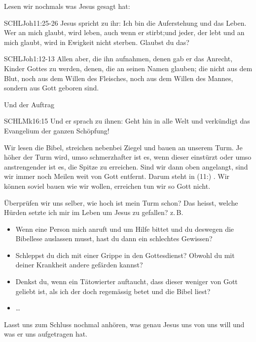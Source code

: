 \documentclass[fontsize=16pt]{mybib}
\begin{document}
\begin{otsblock}
    Lesen wir nochmals was Jesus gesagt hat:
    \begin{bibelbox}{SCHL}{Joh}{11:25-26}
        Jesus spricht zu ihr: Ich bin die Auferstehung und das Leben. Wer an mich glaubt, wird leben, auch wenn er stirbt;und jeder, der lebt und an mich glaubt, wird in Ewigkeit nicht sterben. Glaubst du das?
    \end{bibelbox} 
    \begin{bibelbox}{SCHL}{Joh}{1:12-13}
        Allen aber, die ihn aufnahmen, denen gab er das Anrecht, Kinder Gottes zu werden, denen, die an seinen Namen glauben;
        die nicht aus dem Blut, noch aus dem Willen des Fleisches, noch aus dem Willen des Mannes, sondern aus Gott geboren sind.
    \end{bibelbox}     
    Und der Auftrag
    \begin{bibelbox}{SCHL}{Mk}{16:15}
        Und er sprach zu ihnen: Geht hin in alle Welt und verkündigt das Evangelium der ganzen Schöpfung!
    \end{bibelbox} 
    Wir lesen die Bibel, streichen nebenbei Ziegel und bauen an unserem Turm. Je höher der Turm wird, umso schmerzhafter ist es, wenn dieser einstürzt oder umso anstrengender ist es, die Spitze zu erreichen. Sind wir dann oben angelangt, sind wir immer noch Meilen weit von Gott entfernt. Darum steht in (11:) . Wir können soviel bauen wie wir wollen, erreichen tun wir so Gott nicht.

    Überprüfen wir uns selber, wie hoch ist mein Turm schon? Das heisst, welche Hürden setzte ich mir im Leben um Jesus zu gefallen? z.\,B. 
    \begin{itemize}
        \item Wenn eine Person mich anruft und um Hilfe bittet und du deswegen die Bibellese auslassen musst, hast du dann ein schlechtes Gewissen?
        \item Schleppst du dich mit einer Grippe in den Gottesdienst? Obwohl du mit deiner Krankheit andere gefärden kannst?
        \item Denkst du, wenn ein Tätowierter auftaucht, dass dieser weniger von Gott geliebt ist, als ich der doch regemässig betet und die Bibel liest?
        \item \dots
    \end{itemize}
            
\end{otsblock}
    Lasst uns zum Schluss nochmal anhören, was genau Jesus uns von uns will und was er uns aufgetragen hat. 
\end{document}
